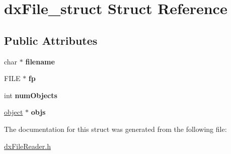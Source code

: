 \hypertarget{structdxFile__struct}{
\section{dxFile\_\-struct Struct Reference}
\label{structdxFile__struct}
}
\subsection*{Public Attributes}
\begin{DoxyCompactItemize}
\item 
\hypertarget{structdxFile__struct_abb3401969cc3e5f9b5e4530a376b4ab9}{
char $\ast$ {\bfseries filename}}
\label{structdxFile__struct_abb3401969cc3e5f9b5e4530a376b4ab9}

\item 
\hypertarget{structdxFile__struct_a175f095e74c172b767d62815e2ceba33}{
FILE $\ast$ {\bfseries fp}}
\label{structdxFile__struct_a175f095e74c172b767d62815e2ceba33}

\item 
\hypertarget{structdxFile__struct_a1d2c7f4080f23d03d4cf936ba9388033}{
int {\bfseries numObjects}}
\label{structdxFile__struct_a1d2c7f4080f23d03d4cf936ba9388033}

\item 
\hypertarget{structdxFile__struct_ad1434457be007f0c3f5433fb3c1619d3}{
\hyperlink{structobject__struct}{object} $\ast$ {\bfseries objs}}
\label{structdxFile__struct_ad1434457be007f0c3f5433fb3c1619d3}

\end{DoxyCompactItemize}


The documentation for this struct was generated from the following file:\begin{DoxyCompactItemize}
\item 
\hyperlink{dxFileReader_8h}{dxFileReader.h}\end{DoxyCompactItemize}
